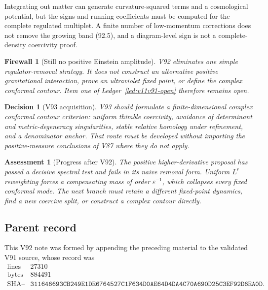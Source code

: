 \documentclass[11pt]{article}
\newtheorem{assessment}[theorem]{Assessment}
\newtheorem{firewall}[theorem]{Firewall}
\newtheorem{decision}[theorem]{Decision}
\begin{document}
\begin{warning}
\label{warn:v11v92-matter}
Integrating out matter can generate curvature-squared terms and a
cosmological potential, but the signs and running coefficients must be
computed for the complete regulated multiplet.  A finite number of
low-momentum corrections does not remove the growing band
(92.5), and a diagram-level sign is not a complete-density
coercivity proof.
\end{warning}

\begin{firewall}[Still no positive Einstein amplitude]
\label{fire:v11v92-boundary}
V92 eliminates one simple regulator-removal strategy.  It does not
construct an alternative positive gravitational interaction, prove
an ultraviolet fixed point, or define the complex conformal contour.
Item one of Ledger~\ref{led:v11v91-open} therefore remains open.
\end{firewall}

\begin{decision}[V93 acquisition]
\label{dec:v11v92-next}
V93 should formulate a finite-dimensional complex conformal contour
criterion: uniform thimble coercivity, avoidance of determinant and
metric-degeneracy singularities, stable relative homology under
refinement, and a denominator anchor.  That route must be developed
without importing the positive-measure conclusions of V87 where they
do not apply.
\end{decision}

\begin{assessment}[Progress after V92]
\label{ass:v11v92-status}
The positive higher-derivative proposal has passed a decisive
spectral test and fails in its naive removal form.  Uniform
\(L^r\) reweighting forces a compensating mass of order
\(\varepsilon^{-1}\), which collapses every fixed conformal mode.
The next branch must retain a different fixed-point dynamics, find a
new coercive split, or construct a complex contour directly.
\end{assessment}

\subsection{Parent record}

This V92 note was formed by appending the preceding material to the
validated V91 source, whose record was
\[
\begin{array}{c|c}
\text{lines}&27310\\
\text{bytes}&884491\\
\text{SHA--256}&
\texttt{311646693CB249E1DE6764527C1F634D0AE64D4DA4C70A690D25C3EF92D6EA0D}.
\end{array}                                                     \tag{92.13}
\]
\end{document}
